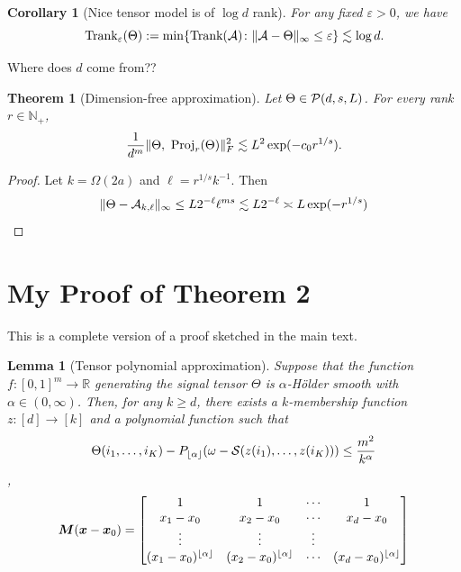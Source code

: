 \documentclass[final,12pt]{colt2020} %
\newtheorem{thm}{Theorem}[section]
\newtheorem{lem}{Lemma}
\newtheorem{cor}{Corollary}
\def\rank{\textup{Trank}}
\begin{document}
\begin{cor}[Nice tensor model is of $\log d$ rank] For any fixed $\varepsilon>0$, we have
\[
\rank_{\varepsilon}(\Theta):=\min\{\rank(\tA)\colon \mnormSize{}{\tA-\Theta}\leq \varepsilon\}\lesssim \log d.
\]
\end{cor}
Where does $d$ come from??
\begin{thm}[Dimension-free approximation] Let $\Theta\in\mathcal{P}(d,s,L)$. For every rank $r\in\mathbb{N}_{+}$,  
\[
{1\over d^m}\FnormSize{}{\Theta,\ \text{Proj}_r(\Theta)}^2\lesssim L^2\exp(-c_0r^{1/s}).
\]
\end{thm}
\begin{proof}
Let $k=\Omega(2a)$ and $\ell=r^{1/s}k^{-1}$. Then
\[
\lVert\Theta-\mathcal{A}_{k,\ell}\rVert_\infty\leq L 2^{-\ell}\ell^{ms} \lesssim L2^{-\ell}\asymp L\exp(-r^{1/s})
\]
\end{proof}
\section{My Proof of Theorem 2}

This is a complete version of a proof sketched in the main text.

\begin{lem}[Tensor polynomial approximation] Suppose that the function $f\colon [0,1]^m\to \mathbb{R}$ generating the signal tensor $\Theta$ is $\alpha$-H\"older smooth with $\alpha\in(0,\infty)$. Then, for any $k\geq d$, there exists a $k$-membership function $z\colon[d]\to[k]$ and a polynomial function such that
\[
\Theta(i_1,\ldots,i_K)- P_{\lfloor \alpha \rfloor}(\omega-\mathcal{S}(z(i_1),\ldots,z(i_K))) \leq {m^2\over k^{\alpha}}
\],
\[
\bm M(\bm x-\bm x_0)=
\begin{bmatrix}
1 &1&\cdots&1\\
x_1-x_0&x_2-x_0& \cdots &x_d-x_0\\
\vdots&\vdots&\vdots\\
(x_1-x_0)^{\lfloor \alpha \rfloor}&(x_2-x_0)^{\lfloor \alpha \rfloor}& \cdots &(x_d-x_0)^{\lfloor \alpha \rfloor}\\
\end{bmatrix}
\]
\end{lem}
\end{document}
